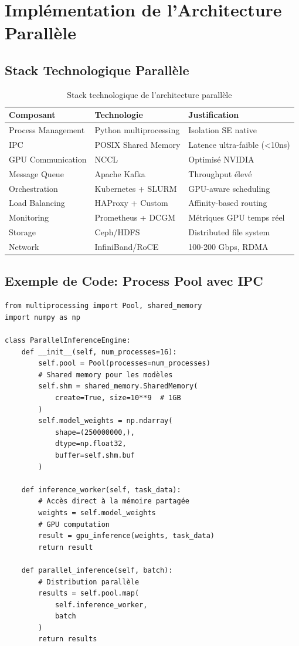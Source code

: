 \documentclass[12pt,a4paper]{article}
\begin{document}
\section{Implémentation de l'Architecture Parallèle}

\subsection{Stack Technologique Parallèle}

\begin{table}[H]
\centering
\begin{tabular}{|l|l|l|}
\hline
\textbf{Composant} & \textbf{Technologie} & \textbf{Justification} \\
\hline
Process Management & Python multiprocessing & Isolation SE native \\
\hline
IPC & POSIX Shared Memory & Latence ultra-faible (<10ns) \\
\hline
GPU Communication & NCCL & Optimisé NVIDIA \\
\hline
Message Queue & Apache Kafka & Throughput élevé \\
\hline
Orchestration & Kubernetes + SLURM & GPU-aware scheduling \\
\hline
Load Balancing & HAProxy + Custom & Affinity-based routing \\
\hline
Monitoring & Prometheus + DCGM & Métriques GPU temps réel \\
\hline
Storage & Ceph/HDFS & Distributed file system \\
\hline
Network & InfiniBand/RoCE & 100-200 Gbps, RDMA \\
\hline
\end{tabular}
\caption{Stack technologique de l'architecture parallèle}
\end{table}

\subsection{Exemple de Code: Process Pool avec IPC}

\begin{verbatim}
from multiprocessing import Pool, shared_memory
import numpy as np

class ParallelInferenceEngine:
    def __init__(self, num_processes=16):
        self.pool = Pool(processes=num_processes)
        # Shared memory pour les modèles
        self.shm = shared_memory.SharedMemory(
            create=True, size=10**9  # 1GB
        )
        self.model_weights = np.ndarray(
            shape=(250000000,), 
            dtype=np.float32,
            buffer=self.shm.buf
        )
    
    def inference_worker(self, task_data):
        # Accès direct à la mémoire partagée
        weights = self.model_weights
        # GPU computation
        result = gpu_inference(weights, task_data)
        return result
    
    def parallel_inference(self, batch):
        # Distribution parallèle
        results = self.pool.map(
            self.inference_worker, 
            batch
        )
        return results
\end{verbatim}
\end{document}
